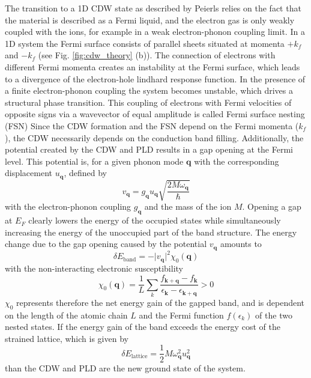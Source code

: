 The transition to a 1D CDW state as described by Peierls relies on the fact that the material is described as a Fermi liquid, and the electron gas is only weakly coupled with the ions, for example in a weak electron-phonon coupling limit.
In a 1D system the Fermi surface consists of parallel sheets situated at momenta $+k_f$ and $-k_f$ (see Fig. \ref{fig:cdw_theory} (b)).
The connection of electrons with different Fermi momenta creates an instability at the Fermi surface, which leads to a divergence of the electron-hole lindhard response function.
In the presence of a finite electron-phonon coupling the system becomes unstable, which drives a structural phase transition.
This coupling of electrons with Fermi velocities of opposite signs via a wavevector of equal amplitude is called Fermi surface nesting (FSN)
Since the CDW formation and the FSN depend on the Fermi momenta ($k_f$), the CDW necessarily depends on the conduction band filling.
Additionally, the potential created by the CDW and PLD results in a gap opening at the Fermi level.
This potential is, for a given phonon mode $\mathbf{q}$ with the corresponding displacement $u_\mathbf{q}$, defined by
\begin{equation}
	v_\mathbf{q} = g_\mathbf{q} u_\mathbf{q} \sqrt{\frac{2M\omega_\mathbf{q}}{\hbar}}
\end{equation}
with the electron-phonon coupling $g_\mathbf{q}$ and the mass of the ion $M$.
Opening a gap at $E_F$ clearly lowers the energy of the occupied states while simultaneously increasing the energy of the unoccupied part of the band structure.
The energy change due to the gap opening caused by the potential $v_\mathbf{q}$ amounts to
\begin{equation}
	\delta E_\text{band} = -\lvert v_\mathbf{q}\rvert^2 \chi_0(\mathbf{q})
\end{equation}
with the non-interacting electronic susceptibility
\begin{equation}
	\chi_0(\mathbf{q}) = \frac{1}{L} \sum_{k}^{} \frac{f_{\mathbf{k}+\mathbf{q}}-f_\mathbf{k}}{\epsilon_\mathbf{k}-\epsilon_{\mathbf{k}+\mathbf{q}}}>0
	\label{eq:susz}
\end{equation}
$\chi_0$ represents therefore the net energy gain of the gapped band, and is dependent on the length of the atomic chain $L$ and the Fermi function $f(\epsilon_k)$ of the two nested states.
If the energy gain of the band exceeds the energy cost of the  strained lattice, which is given by
\begin{equation}
	\delta E_\text{lattice} = \frac{1}{2} M\omega_\mathbf{q}^2 u_\mathbf{q}^2
\end{equation}
than the CDW and PLD are the new ground state of the system.

